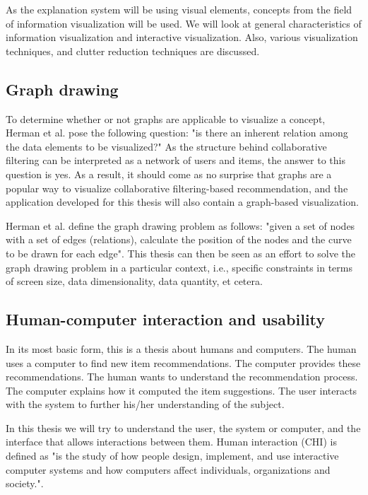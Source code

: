 As the explanation system will be using visual elements, concepts from the field of information visualization will be used. We will look at general characteristics of information visualization and interactive visualization. Also, various visualization techniques, and clutter reduction techniques are discussed.


\subsection{Graph drawing}\label{chapter:introduction:section:perspective:subsection:graph}

To determine whether or not graphs are applicable to visualize a concept, Herman et al. \cite{herman:2000} pose the following question: "is there an inherent relation among the data elements to be visualized?" As the structure behind collaborative filtering can be interpreted as a network of users and items, the answer to this question is yes. As a result, it should come as no surprise that graphs are a popular way to visualize collaborative filtering-based recommendation\cite{bostandjiev:2012, gretarsson:2010}, and the application developed for this thesis will also contain a graph-based visualization.

Herman et al. \cite{herman:2000} define the graph drawing problem as follows: "given a set of nodes with a set of edges (relations), calculate the position of the nodes and the curve to be drawn for each edge". This thesis can then be seen as an effort to solve the graph drawing problem in a particular context, i.e., specific constraints in terms of screen size, data dimensionality, data quantity, et cetera.


\subsection{Human-computer interaction and usability}\label{chapter:introduction:section:perspective:subsection:hci}

In its most basic form, this is a thesis about humans and computers. The human uses a computer to find new item recommendations. The computer provides these recommendations. The human wants to understand the recommendation process. The computer explains how it computed the item suggestions. The user interacts with the system to further his/her understanding of the subject.

In this thesis we will try to understand the user, the system or computer, and the interface that allows interactions between them. Human interaction (CHI) is defined as "is the study of how people design, implement, and use interactive computer systems and how computers affect individuals, organizations and society."\cite{tripathi:2011}.


